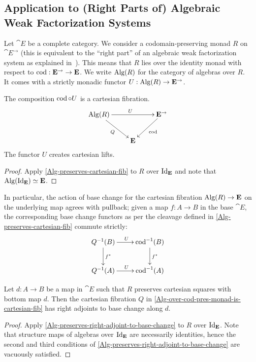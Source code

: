 \documentclass[reqno,10pt,a4paper,oneside]{amsart}
\begin{document}
\subsection{Application to (Right Parts of) Algebraic Weak Factorization Systems}

Let $\cat{E}$ be a complete category.
We consider a codomain-preserving monad $R$ on $\cat{E}^{\to}$ (this is equivalent to the ``right part'' of an algebraic weak factorization system as explained in~\cite{garner:small-object-argument}).
This means that $R$ lies over the identity monad with respect to $\operatorname{cod} : \mathbf{E}^{\to} \to \mathbf{E}$.
We write $\operatorname{Alg}(R)$ for the category of algebras over $R$.
It comes with a strictly monadic functor $U : \operatorname{Alg}(R) \to \mathbf{E}^{\to}$.

\begin{corollary}
\label{Alg-over-cod-pres-monad-is-cartesian-fib}
The composition $\operatorname{cod} \mathbin{\circ} U$ is a cartesian fibration.
\[
\xymatrix{
  \Alg(R)
  \ar[rr]^{U}
  \ar[dr]_{Q}
&&
  \cat{E}^{\to}
  \ar[dl]^{\cod}
\\&
  \cat{E}
}
\]
The functor $U$ creates cartesian lifts.
\end{corollary}

\begin{proof}
Apply \cref{Alg-preserves-cartesian-fib} to $R$ over $\operatorname{Id}_{\mathbf{E}}$ and note that $\operatorname{Alg}(\operatorname{Id}_{\mathbf{E}}) \simeq \mathbf{E}$.
\end{proof}

In particular, the action of base change for the cartesian fibration $\operatorname{Alg}(R) \to \mathbf{E}$ on the underlying map agrees with pullback; given a map $f : A \to B$ in the base $\cat{E}$, the corresponding base change functors as per the cleavage defined in \cref{Alg-preserves-cartesian-fib} commute strictly:
\[
\xymatrix{
  Q^{-1}(B)
  \ar[r]^{U}
  \ar[d]^{f^*}
&
  \cod^{-1}(B)
  \ar[d]^{f^*}
\\
  Q^{-1}(A)
  \ar[r]^{U}
&
  \cod^{-1}(A)
}
\]

\begin{corollary}
Let $d : A \to B$ be a map in $\cat{E}$ such that $R$ preserves cartesian squares with bottom map $d$.
Then the cartesian fibration $Q$ in \cref{Alg-over-cod-pres-monad-is-cartesian-fib} has right adjoints to base change along $d$.
\end{corollary}

\begin{proof}
Apply \cref{Alg-preserves-right-adjoint-to-base-change} to $R$ over $\operatorname{Id}_{\mathbf{E}}$.
Note that structure maps of algebras over $\operatorname{Id}_{\mathbf{E}}$ are necessarily identities, hence the second and third conditions of \cref{Alg-preserves-right-adjoint-to-base-change} are vacuously satisfied.
\end{proof}



\end{document}
